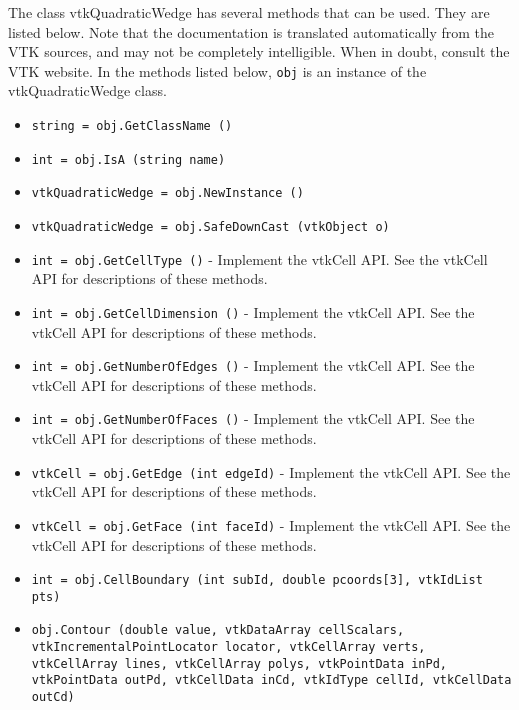 The class vtkQuadraticWedge has several methods that can be used.
  They are listed below.
Note that the documentation is translated automatically from the VTK sources,
and may not be completely intelligible.  When in doubt, consult the VTK website.
In the methods listed below, \verb|obj| is an instance of the vtkQuadraticWedge class.
\begin{itemize}
\item  \verb|string = obj.GetClassName ()|

\item  \verb|int = obj.IsA (string name)|

\item  \verb|vtkQuadraticWedge = obj.NewInstance ()|

\item  \verb|vtkQuadraticWedge = obj.SafeDownCast (vtkObject o)|

\item  \verb|int = obj.GetCellType ()| -  Implement the vtkCell API. See the vtkCell API for descriptions
 of these methods.

\item  \verb|int = obj.GetCellDimension ()| -  Implement the vtkCell API. See the vtkCell API for descriptions
 of these methods.

\item  \verb|int = obj.GetNumberOfEdges ()| -  Implement the vtkCell API. See the vtkCell API for descriptions
 of these methods.

\item  \verb|int = obj.GetNumberOfFaces ()| -  Implement the vtkCell API. See the vtkCell API for descriptions
 of these methods.

\item  \verb|vtkCell = obj.GetEdge (int edgeId)| -  Implement the vtkCell API. See the vtkCell API for descriptions
 of these methods.

\item  \verb|vtkCell = obj.GetFace (int faceId)| -  Implement the vtkCell API. See the vtkCell API for descriptions
 of these methods.

\item  \verb|int = obj.CellBoundary (int subId, double pcoords[3], vtkIdList pts)|

\item  \verb|obj.Contour (double value, vtkDataArray cellScalars, vtkIncrementalPointLocator locator, vtkCellArray verts, vtkCellArray lines, vtkCellArray polys, vtkPointData inPd, vtkPointData outPd, vtkCellData inCd, vtkIdType cellId, vtkCellData outCd)|


\end{itemize}
